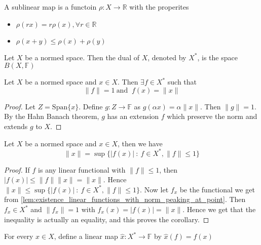 
\begin{definition}
  A sublinear map is a functoin $\rho: X \to \mathbb{R}$ with the properites
  \begin{itemize}[]
    \item $\rho(rx) = r \rho(x), \forall r \in \mathbb{R}$
    \item $\rho(x+y) \le \rho(x)+\rho(y)$
  \end{itemize}
\end{definition}

\begin{definition}
  Let $X$ be a normed space. Then the dual of $X$, denoted by $
  X^{*}$, is the space $B(X, \mathbb{F})$
\end{definition}

\begin{lemma}
  \label{lem:existence_linear_functions_with_norm_peaking_at_point}
  Let $X$ be a normed space and $x \in X$. Then $\exists f \in X^{*}$
  such that \[
    \|f\| = 1 \ \textrm{and } \ f(x) = \|x\|
  \]
\end{lemma}
\begin{proof}
  Let $Z = \textrm{Span}\{ x \}$. Define $g: Z \to \mathbb{F}$ as
  $g(\alpha  x) = \alpha \|x\|$. Then $\|g\| = 1$. By the Hahn Banach
  theorem, $g$ has an extension $f$ which preserve the norm and
  extends $g$ to $X$.
\end{proof}

\begin{corollary}
  \label{cor:dual_maps_norm_elements}
  Let $X$ be a normed space and $x \in X$, then we have \[
    \|x\| = \sup \{ |f(x)| \ : \ f \in X^{*}, \|f\| \le 1 \}
  \]
\end{corollary}
\begin{proof}
  If $f$ is any linear functional with $\|f\| \le 1$, then $|f(x)|
  \le \|f\|\|x\| = \|x\|$. Hence $\|x\| \le \sup \{ |f(x)| \ : \ f
  \in X^{*}, \|f\| \le 1 \}$.
  Now let $f_x$ be the functional we get from
  \autoref{lem:existence_linear_functions_with_norm_peaking_at_point}.
  Then $f_x \in X^{*}$ and $\|f_x\| = 1$ with $f_x(x) = |f(x)| =
  \|x\|$. Hence we get that the inequality is actually an equality,
  and this proves the corollary.
\end{proof}

\begin{definition}
  For every $x \in X$, define a linear map $\hat{x}: X^{*} \to
  \mathbb{F}$ by $\hat{x}(f) = f(x)$
\end{definition}

